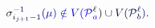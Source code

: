 \documentclass[12pt]{article}
\begin{document}
\makeatletter
\renewcommand*{\@textcolor}[3]{%
  \protect\leavevmode
  \begingroup
    \color#1{#2}#3%
  \endgroup
}
\makeatother
\begin{displaymath}
\mathcolor[RGB]{0,0,15}{\sigma} _ { \mathcolor[RGB]{0,0,30}{i} _ { \mathcolor[RGB]{0,0,45}{j} \mathcolor[RGB]{0,0,60}{+} \mathcolor[RGB]{0,0,75}{1} } \mathcolor[RGB]{0,0,90}{-} \mathcolor[RGB]{0,0,105}{1} } ^ { \mathcolor[RGB]{0,0,120}{-} \mathcolor[RGB]{0,0,135}{1} } \mathcolor[RGB]{0,0,150}{(} \mathcolor[RGB]{0,0,165}{\mu} \mathcolor[RGB]{0,0,180}{)} \mathcolor[RGB]{0,0,195}{\notin} \mathcolor[RGB]{0,0,210}{V} \mathcolor[RGB]{0,0,225}{(} \mathcal { \mathcolor[RGB]{0,0,240}{P} } _ { \mathcolor[RGB]{0,0,255}{a} } ^ { \mathcolor[RGB]{0,15,0}{\ell} } \mathcolor[RGB]{0,15,15}{)} \mathcolor[RGB]{0,15,30}{\cup} \mathcolor[RGB]{0,15,45}{V} \mathcolor[RGB]{0,15,60}{(} \mathcal { \mathcolor[RGB]{0,15,75}{P} } _ { \mathcolor[RGB]{0,15,90}{b} } ^ { \mathcolor[RGB]{0,15,105}{\ell} } \mathcolor[RGB]{0,15,120}{)} \mathcolor[RGB]{0,15,135}{.}
\end{displaymath}
\end{document}
